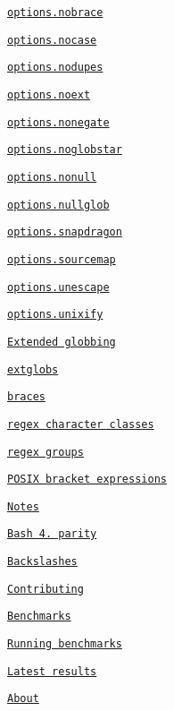 \begin{DoxyItemize}
\begin{DoxyItemize}
\item \href{#optionsnobrace}{\tt options.\+nobrace}
\item \href{#optionsnocase}{\tt options.\+nocase}
\item \href{#optionsnodupes}{\tt options.\+nodupes}
\item \href{#optionsnoext}{\tt options.\+noext}
\item \href{#optionsnonegate}{\tt options.\+nonegate}
\item \href{#optionsnoglobstar}{\tt options.\+noglobstar}
\item \href{#optionsnonull}{\tt options.\+nonull}
\item \href{#optionsnullglob}{\tt options.\+nullglob}
\item \href{#optionssnapdragon}{\tt options.\+snapdragon}
\item \href{#optionssourcemap}{\tt options.\+sourcemap}
\item \href{#optionsunescape}{\tt options.\+unescape}
\item \href{#optionsunixify}{\tt options.\+unixify}
\end{DoxyItemize}
\item \href{#extended-globbing}{\tt Extended globbing}
\begin{DoxyItemize}
\item \href{#extglobs}{\tt extglobs}
\item \href{#braces}{\tt braces}
\item \href{#regex-character-classes}{\tt regex character classes}
\item \href{#regex-groups}{\tt regex groups}
\item \href{#posix-bracket-expressions}{\tt P\+O\+S\+IX bracket expressions}
\end{DoxyItemize}
\item \href{#notes}{\tt Notes}
\begin{DoxyItemize}
\item \href{#bash-43-parity}{\tt Bash 4. parity}
\item \href{#backslashes}{\tt Backslashes}
\end{DoxyItemize}
\item \href{#contributing}{\tt Contributing}
\item \href{#benchmarks}{\tt Benchmarks}
\begin{DoxyItemize}
\item \href{#running-benchmarks}{\tt Running benchmarks}
\item \href{#latest-results}{\tt Latest results}
\end{DoxyItemize}
\item \href{#about}{\tt About}
\end{DoxyItemize}


